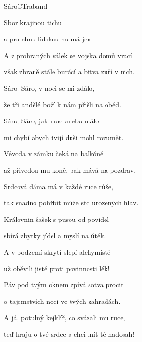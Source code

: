 \begin{song}{Sáro}{C}{Traband}

\begin{SBVerse}

Sbor    krajinou tichu 

a pro chnu lidskou hu má jen  

A z prohraných válek se vojska domů vrací 

však zbraně stále burácí a bitva zuří v nich.

\end{SBVerse}

\begin{SBChorus}

Sáro, Sáro, v noci se mi zdálo, 

že tři andělé boží k nám přišli na oběd. 

Sáro, Sáro, jak moc anebo málo 

mi chybí abych tvijí duši mohl rozumět.

\end{SBChorus}

\begin{SBVerse}

Vévoda v zámku čeká na balkóně 

až přivedou mu koně, pak mává na pozdrav. 

Srdcová dáma má v každé ruce růže, 

tak snadno pohřbít může sto urozených hlav.

\end{SBVerse}

\begin{SBVerse}

Královnin šašek s pusou od povidel 

sbírá zbytky jídel a myslí na útěk. 

A v podzemí skrytí slepí alchymisté 

už oběvili jistě proti povinnosti lék!

\end{SBVerse}

\begin{SBVerse}

Páv pod tvým oknem zpívá sotva procit 

o tajemstvích noci ve tvých zahradách. 

A já, potulný kejklíř, co svázali mu ruce, 

teď hraju o tvé srdce a chci mít tě nadosah!


\end{SBVerse}
\end{song}
